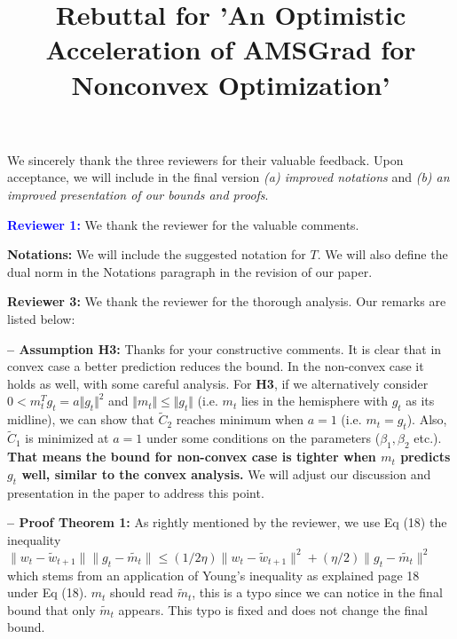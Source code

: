 \documentclass[wcp]{jmlr}
\title[]{Rebuttal for 'An Optimistic Acceleration of AMSGrad for Nonconvex Optimization'}
\begin{document}
\maketitle


We sincerely thank the three reviewers for their valuable feedback. 
Upon acceptance, we will include in the final version \emph{{\sf (a)} improved notations} and \emph{{\sf (b)} an improved presentation of our bounds and proofs}. 


\vspace{0.05in}

\textbf{\textcolor{blue}{Reviewer 1:}} We thank the reviewer for the valuable comments.\vspace{-5pt}

\medskip

\textbf{Notations:} 
We will include the suggested notation for $T$.
We will also define the dual norm in the Notations paragraph in the revision of our paper.

\vspace{0.05in}


\textbf{\textcolor{green!50!black}{Reviewer 3:}} We thank the reviewer for the thorough analysis. Our remarks are listed below:\vspace{-5pt}

\medskip
\textbf{-- Assumption H3:}
Thanks for your constructive comments. It is clear that in convex case a better prediction reduces the bound. In the non-convex case it holds as well, with some careful analysis. For \textbf{H3}, if we alternatively consider $0<m_t^T g_t=a\Vert g_t\Vert^2$ and $\Vert m_t\Vert\leq \Vert g_t\Vert$ (i.e. $m_t$ lies in the hemisphere with $g_t$ as its midline), we can show that $\tilde C_2$ reaches minimum when $a=1$ (i.e. $m_t=g_t$). Also, $\tilde C_1$ is minimized at $a=1$ under some conditions on the parameters ($\beta_1,\beta_2$ etc.). \textbf{That means the bound for non-convex case is tighter when $m_t$ predicts $g_t$ well, similar to the convex analysis.} We will adjust our discussion and presentation in the paper to address this point. \vspace{-5pt}

\medskip
\textbf{-- Proof Theorem 1:} As rightly mentioned by the reviewer, we use Eq (18) the inequality $\|w_t-\tilde{w}_{t+1}\|\|g_t-\tilde{m_t}\|\leq (1/2\eta)\|w_t-\tilde{w}_{t+1}\|^2+ (\eta/2)\|g_t-\tilde{m_t}\|^2$ which stems from an application of Young's inequality as explained page 18 under Eq (18). $m_t$ should read $\tilde{m}_t$, this is a typo since we can notice in the final bound that only $\tilde{m}_t$ appears. This typo is fixed and does not change the final bound.
\end{document}
